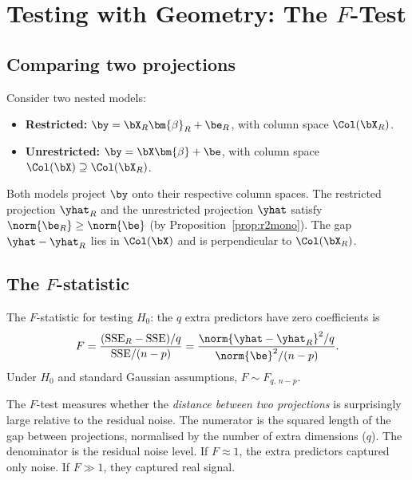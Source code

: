 \section{Testing with Geometry: The $F$-Test}\label{sec:ftest}

\subsection{Comparing two projections}

Consider two nested models:
\begin{itemize}[nosep]
  \item \textbf{Restricted:} $\by = \bX_R\bm{\beta}_R + \be_R$,
        with column space $\Col(\bX_R)$.
  \item \textbf{Unrestricted:} $\by = \bX\bm{\beta} + \be$,
        with column space $\Col(\bX)\supseteq\Col(\bX_R)$.
\end{itemize}
Both models project $\by$ onto their respective column spaces.
The restricted projection $\yhat_R$ and the unrestricted projection
$\yhat$ satisfy $\norm{\be_R}\ge\norm{\be}$ (by Proposition~\ref{prop:r2mono}).
The gap $\yhat - \yhat_R$ lies in $\Col(\bX)$ and is perpendicular to
$\Col(\bX_R)$.

\subsection{The $F$-statistic}

\begin{definition}
The $F$-statistic for testing $H_0$: the $q$ extra predictors
have zero coefficients is
\begin{equation}\label{eq:fstat}
  F = \frac{(\text{SSE}_R - \text{SSE})/q}{\text{SSE}/(n-p)}
    = \frac{\norm{\yhat-\yhat_R}^2/q}{\norm{\be}^2/(n-p)}.
\end{equation}
Under $H_0$ and standard Gaussian assumptions,
$F\sim F_{q,\,n-p}$.
\end{definition}

\begin{keyinsight}
The $F$-test measures whether the \emph{distance between two projections}
is surprisingly large relative to the residual noise.
The numerator is the squared length of the gap between projections,
normalised by the number of extra dimensions ($q$).
The denominator is the residual noise level.
If $F\approx 1$, the extra predictors captured only noise.
If $F\gg 1$, they captured real signal.
\end{keyinsight}

